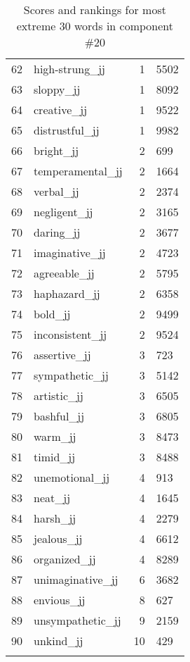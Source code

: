 \begin{longtable}[!htbp]{| rlr@{.}l |}
    62 & high-strung\_jj & 1 & 5502 \\
    63 & sloppy\_jj & 1 & 8092 \\
    64 & creative\_jj & 1 & 9522 \\
    65 & distrustful\_jj & 1 & 9982 \\
    66 & bright\_jj & 2 & 699 \\
    67 & temperamental\_jj & 2 & 1664 \\
    68 & verbal\_jj & 2 & 2374 \\
    69 & negligent\_jj & 2 & 3165 \\
    70 & daring\_jj & 2 & 3677 \\
    71 & imaginative\_jj & 2 & 4723 \\
    72 & agreeable\_jj & 2 & 5795 \\
    73 & haphazard\_jj & 2 & 6358 \\
    74 & bold\_jj & 2 & 9499 \\
    75 & inconsistent\_jj & 2 & 9524 \\
    76 & assertive\_jj & 3 & 723 \\
    77 & sympathetic\_jj & 3 & 5142 \\
    78 & artistic\_jj & 3 & 6505 \\
    79 & bashful\_jj & 3 & 6805 \\
    80 & warm\_jj & 3 & 8473 \\
    81 & timid\_jj & 3 & 8488 \\
    82 & unemotional\_jj & 4 & 913 \\
    83 & neat\_jj & 4 & 1645 \\
    84 & harsh\_jj & 4 & 2279 \\
    85 & jealous\_jj & 4 & 6612 \\
    86 & organized\_jj & 4 & 8289 \\
    87 & unimaginative\_jj & 6 & 3682 \\
    88 & envious\_jj & 8 & 627 \\
    89 & unsympathetic\_jj & 9 & 2159 \\
    90 & unkind\_jj & 10 & 429 \\
    \hline
    \caption{Scores and rankings for most extreme 30 words in component \#20} \\
\end{longtable}
